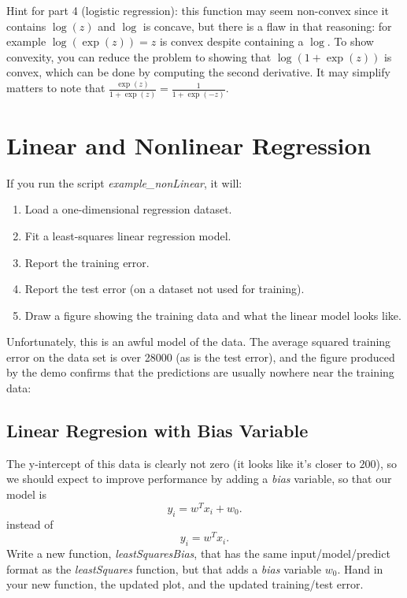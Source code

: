 \documentclass{article}
\def\blu#1{{\color{blu}#1}}
\newcommand{\centerfig}[2]{\begin{center}\texttt{[image: a3f/\#2]}\end{center}}
\def\enum#1{\begin{enumerate}#1\end{enumerate}}
\begin{document}
Hint for part 4 (logistic regression): this function may seem non-convex since it contains $\log(z)$ and $\log$ is concave, but there is a flaw in that reasoning: for example $\log(\exp(z))=z$ is convex despite containing a $\log$. To show convexity, you can reduce the problem to showing that $\log(1+\exp(z))$ is convex, which can be done by computing the second derivative. It may simplify matters to note that $\frac{\exp(z)}{1+\exp(z)} = \frac{1}{1+\exp(-z)}$.



\section{Linear and Nonlinear Regression}


If you run the script \emph{example\_nonLinear}, it will:
\enum{
\item Load a one-dimensional regression dataset.
\item Fit a least-squares linear regression model.
\item Report the training error.
\item Report the test error (on a dataset not used for training).
\item Draw a figure showing the training data and what the linear model looks like.
}
Unfortunately, this is an awful model of the data. The average squared training error on the data set is over 28000 (as is the test error), and the figure produced by the demo confirms that the predictions are usually nowhere near the training data:


\subsection{Linear Regresion with Bias Variable}

The y-intercept of this data is clearly not zero (it looks like it's closer to $200$), so we should expect to improve performance by adding a \emph{bias} variable, so that our model is
\[
y_i = w^Tx_i + w_0.
\]
instead of
\[
y_i = w^Tx_i.
\]
\blu{Write a new function, \emph{leastSquaresBias}, that has the same input/model/predict format as the \emph{leastSquares} function, but that adds a \emph{bias} variable $w_0$. Hand in your new function, the updated plot, and the updated training/test error.}
\end{document}
